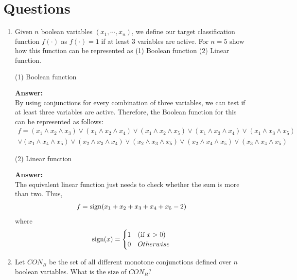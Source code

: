 

\oddsidemargin 0in
\evensidemargin 0in
\textwidth 6.5in
\topmargin -0.5in
\textheight 9.0in




\pagestyle{myheadings}  %

\section{Questions}

\begin{enumerate}
\item Given $n$ boolean variables $(x_1,\cdots,x_n)$, we define our target classification function $f(\cdot)$ as $f(\cdot)=1$ if at least 3 variables are active. For $n=5$ show how this function can be represented as (1) Boolean function (2) Linear function.

(1) Boolean function

{\bf Answer:}\\
By using conjunctions for every combination of three variables, we can test if at least three variables are active. Therefore, the Boolean function for this can be represented as follows:
\begin{eqnarray*}
f=(x_1 \wedge x_2 \wedge x_3) \vee (x_1 \wedge x_2 \wedge x_4) \vee (x_1 \wedge x_2 \wedge x_5) \vee (x_1 \wedge x_3 \wedge x_4) \vee (x_1 \wedge x_3 \wedge x_5) \\
\vee (x_1 \wedge x_4 \wedge x_5) \vee (x_2 \wedge x_3 \wedge x_4) \vee (x_2 \wedge x_3 \wedge x_5) \vee (x_2 \wedge x_4 \wedge x_5) \vee (x_3 \wedge x_4 \wedge x_5)
\end{eqnarray*}

(2) Linear function

{\bf Answer:}\\
The equivalent linear function just needs to check whether the sum is more than two. Thus,
\[
f = {\rm sign}(x_1 + x_2 + x_3 + x_4 + x_5 - 2)
\]
where
\[
{\rm sign}(x) = \begin{cases}
1 & ({\rm if} \; x > 0) \\
0 & Otherwise
\end{cases}
\]


\item Let $CON_B$ be the set of all different monotone conjunctions defined over $n$ boolean variables. What is the size of $CON_B$?


\end{enumerate}
